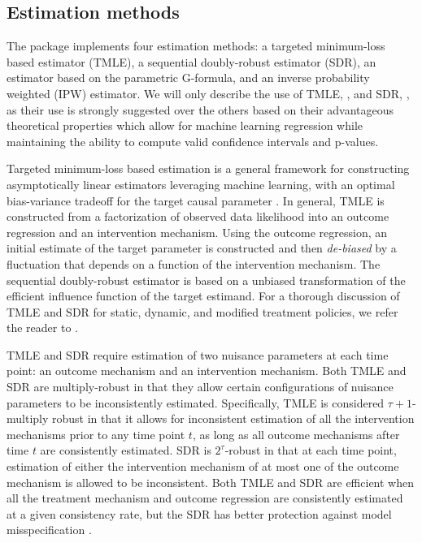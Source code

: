 \documentclass[]{jss}
\begin{document}
\hypertarget{estimation-methods}{%
\subsection{Estimation methods}\label{estimation-methods}}

The  package implements four estimation methods: a targeted
minimum-loss based estimator (TMLE), a sequential doubly-robust
estimator (SDR), an estimator based on the parametric G-formula, and an inverse
probability weighted (IPW) estimator. We will only describe the use of
TMLE, , and SDR, , as
their use is strongly suggested over the others based on their
advantageous theoretical properties which allow for machine learning
regression while maintaining the ability to compute valid confidence
intervals and p-values.

Targeted minimum-loss based estimation is a general framework for
constructing asymptotically linear estimators leveraging machine
learning, with an optimal bias-variance tradeoff for the target causal
parameter \citep{vanderLaanRose11, vanderLaanRose18}. In general, TMLE
is constructed from a factorization of observed data likelihood into
an outcome regression and an intervention mechanism. Using the outcome
regression, an initial estimate of the target parameter is constructed
and then \textit{de-biased} by a fluctuation that depends on a
function of the intervention mechanism. The sequential doubly-robust
estimator is based on a unbiased transformation of the efficient
influence function of the target estimand. For a thorough discussion
of TMLE and SDR for static, dynamic, and modified treatment policies,
we refer the reader to
\cite{van2011targeted,luedtke2017sequential,rotnitzky2017multiply,
  diazNonparametricCausalEffects2020a}.

TMLE and SDR require estimation of two nuisance parameters at each
time point: an outcome mechanism and an intervention mechanism. Both
TMLE and SDR are multiply-robust in that they allow certain
configurations of nuisance parameters to be inconsistently
estimated. Specifically, TMLE is considered \(\tau + 1\)-multiply robust in
that it allows for inconsistent estimation of all the intervention
mechanisms prior to any time point $t$, as long as all outcome
mechanisms after time $t$ are consistently estimated. SDR is
\(2^{\tau}\)-robust in that at each time point, estimation of either
the intervention mechanism of at most one of the outcome mechanism is
allowed to be inconsistent. Both TMLE and SDR are efficient when all
the treatment mechanism and outcome regression are consistently
estimated at a given consistency rate, but the SDR has better
protection against model misspecification \citep[see][for more details]{luedtke2017sequential,rotnitzky2017multiply,
  diazNonparametricCausalEffects2020a}.
\end{document}
